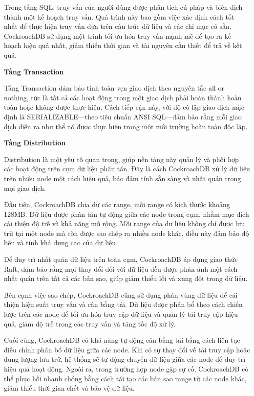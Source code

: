 \documentclass{extreport}[13.5pt, oneside,a4paper]
\begin{document}
Trong tầng SQL, truy vấn của người dùng được phân tích cú pháp và biên dịch thành một kế hoạch truy vấn. Quá trình này bao gồm việc xác định cách tốt nhất để thực hiện truy vấn dựa trên cấu trúc dữ liệu và các chỉ mục có sẵn. CockroachDB sử dụng một trình tối ưu hóa truy vấn mạnh mẽ để tạo ra kế hoạch hiệu quả nhất, giảm thiểu thời gian và tài nguyên cần thiết để trả về kết quả.


\textbf{Tầng Transaction}

Tầng Transaction đảm bảo tính toàn vẹn giao dịch theo nguyên tắc all or nothing, tức là tất cả các hoạt động trong một giao dịch phải hoàn thành hoàn toàn hoặc không được thực hiện. Cách tiếp cận này, với độ cô lập giao dịch mặc định là SERIALIZABLE—theo tiêu chuẩn ANSI SQL—đảm bảo rằng mỗi giao dịch diễn ra như thể nó được thực hiện trong một môi trường hoàn toàn độc lập.

\textbf{Tầng Distribution}

Distribution là một yếu tố quan trọng, giúp nền tảng này quản lý và phối hợp các hoạt động trên cụm dữ liệu phân tán. Đây là cách CockroachDB xử lý dữ liệu trên nhiều node một cách hiệu quả, bảo đảm tính sẵn sàng và nhất quán trong mọi giao dịch.

Đầu tiên, CockroachDB chia dữ các range, mỗi range có kích thước khoảng 128MB. Dữ liệu được phân tán tự động giữa các node trong cụm, nhằm mục đích cải thiện độ trễ và khả năng mở rộng. Mỗi range của dữ liệu không chỉ được lưu trữ tại một node mà còn được sao chép ra nhiều node khác, điều này đảm bảo độ bền và tính khả dụng cao của dữ liệu.

Để duy trì nhất quán dữ liệu trên toàn cụm, CockroachDB áp dụng giao thức Raft, đảm bảo rằng mọi thay đổi đối với dữ liệu đều được phản ánh một cách nhất quán trên tất cả các bản sao, giúp giảm thiểu lỗi và xung đột trong dữ liệu.

Bên cạnh việc sao chép, CockroachDB cũng sử dụng phân vùng dữ liệu để cải thiện hiệu suất truy vấn và cân bằng tải. Dữ liệu được phân bổ theo cách chiến lược trên các node để tối ưu hóa truy cập dữ liệu và quản lý tải truy cập hiệu quả, giảm độ trễ trong các truy vấn và tăng tốc độ xử lý.

Cuối cùng, CockroachDB có khả năng tự động cân bằng tải bằng cách liên tục điều chỉnh phân bổ dữ liệu giữa các node. Khi có sự thay đổi về tải truy cập hoặc dung lượng lưu trữ, hệ thống sẽ tự động chuyển dữ liệu giữa các node để duy trì hiệu quả hoạt động. Ngoài ra, trong trường hợp node gặp sự cố, CockroachDB có thể phục hồi nhanh chóng bằng cách tái tạo các bản sao range từ các node khác, giảm thiểu thời gian chết và bảo vệ dữ liệu.
\end{document}

